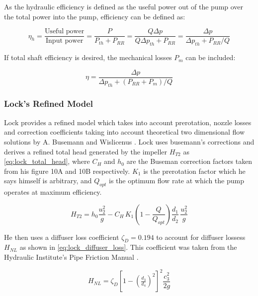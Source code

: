 As the hydraulic efficiency is defined as the useful power out of the pump over the total power into the pump, efficiency can be defined as:

\begin{equation}
\eta_h  = \frac{\text{Useful power}}{\text{Input power}} = \frac{P}{P_{th}+P_{RR}}
  = \frac{Q\Delta p}{Q\Delta p_{th}+P_{RR}}
  = \frac{\Delta p}{\Delta p_{th}+P_{RR}/Q}
\end{equation}

If total shaft efficiency is desired, the mechanical losses $P_m$ can be included:

\begin{equation}
    \eta=\frac{\Delta p}{\Delta p_{th}+(P_{RR}+P_m)/Q}
\end{equation}

\subsubsection{Lock's Refined Model}
\label{sec:theory_lock}

Lock provides a refined model which takes into account prerotation, nozzle losses and correction coefficients taking into account theoretical two dimensional flow solutions by A. Busemann and Wislicenus \cite{lockForcedVortexPump1966,wislicenusFluidMechanicsTurbomachinery1947}. Lock uses busemann's corrections and derives a refined total head generated by the impeller $H_{T2}$ as \cref{eq:lock_total_head}, where $C_H$ and $h_0$ are the Buseman correction factors taken from his figure 10A and 10B respectively. $K_1$ is the prerotation factor which he says himself is arbitrary, and $Q_{opt}$ is the optimum flow rate at which the pump operates at maximum efficiency.

\begin{equation}
    H_{T2} = h_0\frac{u_2^2}{g} - C_H\,K_1\!\left(1-\frac{Q}{Q_{opt}}\right)\!\frac{d_1}{d_2}\,\frac{u_2^2}{g}
    \label{eq:lock_total_head}
\end{equation}

He then uses a diffuser loss coefficient $\zeta_D=0.194$ to account for diffuser lossess $H_{NL}$ as shown in \cref{eq:lock_diffuser_loss}. This coefficient was taken from the Hydraulic Institute's Pipe Friction Manual \cite{hydraulicinstitutePipeFrictionManual1954}.

\begin{equation}
H_{NL} = \zeta_{D}\left[1-\left(\tfrac{d_3}{d_4}\right)^2\right]^2\frac{c_3^2}{2g}
\label{eq:lock_diffuser_loss}
\end{equation}

